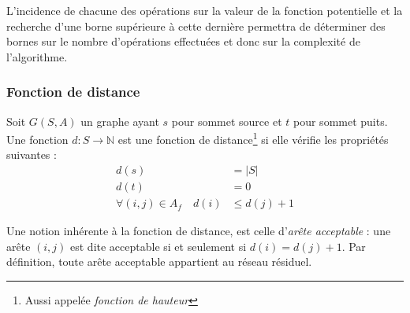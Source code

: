 L'incidence de chacune des opérations sur la valeur de la fonction potentielle et la recherche d'une
borne supérieure à cette dernière permettra de déterminer des bornes sur le nombre d'opérations
effectuées et donc sur la complexité de l'algorithme.

\subsubsection{Fonction de distance}

Soit $G(S, A)$ un graphe ayant $s$ pour sommet source et $t$ pour sommet puits. Une fonction $d: S
\rightarrow \mathbb{N}$ est une fonction de distance\footnote{Aussi appelée \emph{fonction de
	hauteur}} si elle vérifie les propriétés suivantes :
\begin{subequations}
	\label{eq:prop_haut}
	\begin{align}
		d(s) &= |S| \label{eq:ph1} \\
		d(t) &= 0   \label{eq:ph2} \\
		\forall (i,j) \in A_f \quad d(i) &\leq d(j) + 1 \label{eq:ph3} 
	\end{align}
\end{subequations}

Une notion inhérente à la fonction de distance, est celle d'\emph{arête acceptable} : une arête $(i,j)$ est
dite acceptable si et seulement si $d(i) = d(j) + 1$. Par définition, toute arête acceptable
appartient au réseau résiduel.

